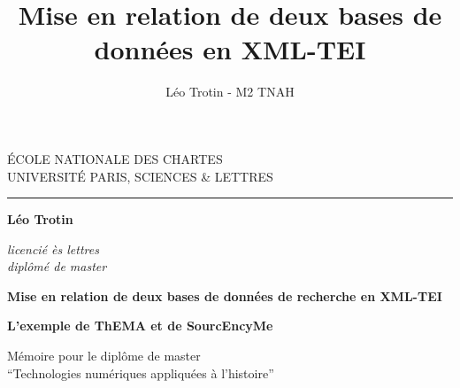 \documentclass[a4paper,12pt,twoside]{book} %
\author{Léo Trotin - M2 TNAH}
\title{Mise en relation de deux bases de données en XML-TEI}
\begin{document}
	\begin{titlepage}
		\begin{center}
			
			\bigskip
			
			\begin{large}				
				ÉCOLE NATIONALE DES CHARTES\\
				UNIVERSITÉ PARIS, SCIENCES \& LETTRES
			\end{large}
			\begin{center}\rule{2cm}{0.02cm}\end{center}
			
			\bigskip
			\bigskip
			\bigskip
			\begin{Large}
				\textbf{Léo Trotin}\\
			\end{Large}
			\begin{normalsize} \textit{licencié ès lettres}\\
				\textit{diplômé de master}
			\end{normalsize}
			
			\bigskip
			\bigskip
			\bigskip
			
			\begin{Huge}
				\textbf{Mise en relation de deux bases de données de recherche en XML-TEI}\\
			\end{Huge}
			\bigskip
			\bigskip
			\begin{LARGE}
				\textbf{L'exemple de ThEMA et de SourcEncyMe}\\
			\end{LARGE}
			
			\bigskip
			\bigskip
			\bigskip
			\begin{large}
			\end{large}
			\vfill
			
			\begin{large}
				Mémoire 
				pour le diplôme de master \\
				\enquote{Technologies numériques appliquées à l'histoire} \\
			\end{large}
			
		\end{center}
	\end{titlepage}

	\thispagestyle{empty}	
	\cleardoublepage
	
\frontmatter
\end{document}
